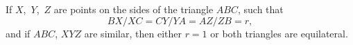 If $X$,~$Y$,~$Z$ are points on the sides of the triangle $ABC$, such that
\[
BX/XC = CY/YA = AZ/ZB = r,
\]
and if $ABC$, $XYZ$ are similar, then either $r = 1$ or both triangles are
equilateral.


